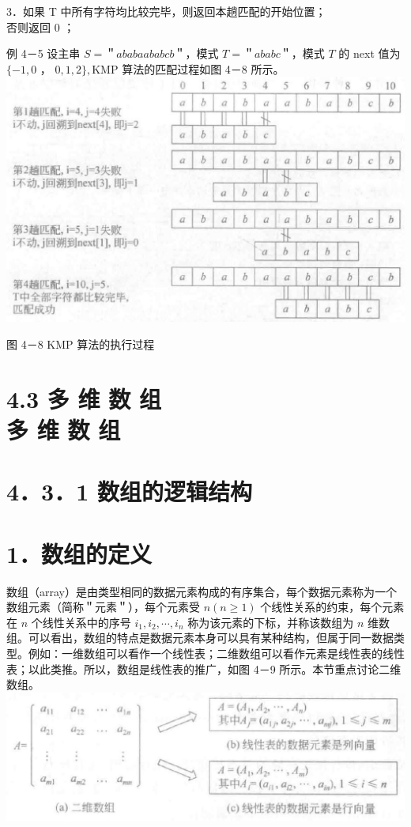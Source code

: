 \documentclass[10pt]{article}
\begin{document}
3．如果 T 中所有字符均比较完毕，则返回本趟匹配的开始位置；\\
否则返回 0 ；

例 4－5 设主串 $S=$＂$a b a b a a b a b c b$＂，模式 $T=$＂$a b a b c$＂，模式 $T$ 的 next 值为 $\{-1,0$ ， $0,1,2\}, \mathrm{KMP}$ 算法的匹配过程如图 4－8 所示。\\
\includegraphics[max width=\textwidth, center]{2025_06_06_704745ea57b15b2333e5g-120(1)}

图 4－8 KMP 算法的执行过程

\section*{4.3 多 维 数 组 \\
 多 维 数 组}
\section*{4．3．1 数组的逻辑结构}
\section*{1．数组的定义}
数组（array）是由类型相同的数据元素构成的有序集合，每个数据元素称为一个数组元素（简称＂元素＂），每个元素受 $n(n \geqslant 1)$ 个线性关系的约束，每个元素在 $n$ 个线性关系中的序号 $i_{1}, i_{2}, \cdots, i_{n}$ 称为该元素的下标，并称该数组为 $n$ 维数组。可以看出，数组的特点是数据元素本身可以具有某种结构，但属于同一数据类型。例如：一维数组可以看作一个线性表；二维数组可以看作元素是线性表的线性表；以此类推。所以，数组是线性表的推广，如图 4－9 所示。本节重点讨论二维数组。\\
\includegraphics[max width=\textwidth, center]{2025_06_06_704745ea57b15b2333e5g-120}
\end{document}
